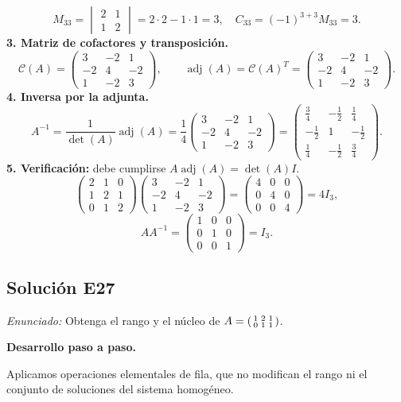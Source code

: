 \documentclass[12pt]{article}
\theoremstyle{remark}
\newcommand{\adj}{\operatorname{adj}}
\newcommand{\solucion}[2]{\Needspace{11\baselineskip}\subsection*{Solución E#1}\noindent\textit{Enunciado:} #2\par\medskip\noindent\textbf{Desarrollo paso a paso.}\par\medskip}
\begin{document}
\[
M_{33}=\begin{vmatrix}2&1\\1&2\end{vmatrix}=2\cdot 2-1\cdot 1=3,\quad C_{33}=(-1)^{3+3}M_{33}=3.
\]
\textbf{3. Matriz de cofactores y transposición.}
\[
\mathcal{C}(A)=\begin{pmatrix}3&-2&1\\-2&4&-2\\1&-2&3\end{pmatrix},\qquad\adj(A)=\mathcal{C}(A)^T=\begin{pmatrix}3&-2&1\\-2&4&-2\\1&-2&3\end{pmatrix}.
\]
\textbf{4. Inversa por la adjunta.}
\[
A^{-1}=\frac1{\det(A)}\adj(A)=\frac1{4}\begin{pmatrix}3&-2&1\\-2&4&-2\\1&-2&3\end{pmatrix}=\begin{pmatrix}\frac{3}{4}&- \frac{1}{2}&\frac{1}{4}\\- \frac{1}{2}&1&- \frac{1}{2}\\\frac{1}{4}&- \frac{1}{2}&\frac{3}{4}\end{pmatrix}.
\]
\textbf{5. Verificación:} debe cumplirse $A\adj(A)=\det(A)I$.
\[
\begin{pmatrix}2&1&0\\1&2&1\\0&1&2\end{pmatrix}\begin{pmatrix}3&-2&1\\-2&4&-2\\1&-2&3\end{pmatrix}=\begin{pmatrix}4&0&0\\0&4&0\\0&0&4\end{pmatrix}=4I_{3},
\]
\[
AA^{-1}=\begin{pmatrix}1&0&0\\0&1&0\\0&0&1\end{pmatrix}=I_{3}.
\]

\medskip

\solucion{27}{Obtenga el rango y el núcleo de $A=\begin{psmallmatrix}1&2&1\\0&1&1\end{psmallmatrix}$.}
Aplicamos operaciones elementales de fila, que no modifican el rango ni el conjunto de soluciones del sistema homogéneo.
\end{document}
